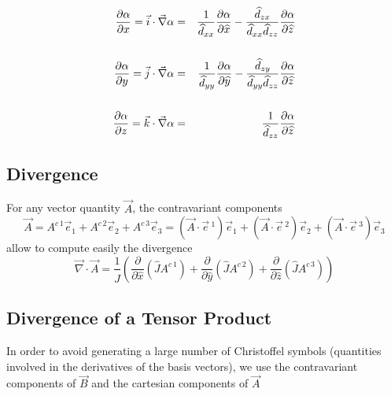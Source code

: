 \begin{eqnarray}
{\partial \alpha \over \partial x }  =
\vec{i} \cdot \vec{\nabla} \alpha & = & \dfrac{1}{\widehat{d}_{xx}}
\dfrac{\partial \alpha }{\partial \widehat{x}}- \dfrac{\widehat{d}_{zx}}{\widehat{d}_{xx}\widehat{d}_{zz}}
\dfrac{\partial \alpha }{\partial \widehat{z}}
\nonumber \\ & &\nonumber  \\
{\partial \alpha \over \partial y }  =
\vec{j} \cdot \vec{\nabla} \alpha & = & \dfrac{1}{\widehat{d}_{yy}}
\dfrac{\partial \alpha }{\partial \widehat{y}}- \dfrac{\widehat{d}_{zy}}{\widehat{d}_{yy}\widehat{d}_{zz}}
\dfrac{\partial \alpha }{\partial \widehat{z}}
\nonumber \\ & &  \\
{\partial \alpha \over \partial z }  =
\vec{k} \cdot \vec{\nabla} \alpha & = & \dfrac{1}{\widehat{d}_{zz}}
\dfrac{\partial \alpha }{\partial \widehat{z}} \nonumber
\end{eqnarray}


\subsection{Divergence}

For any vector quantity $\vec{A}$, the contravariant components
\begin{equation}
\vec{A} =A^{c \, 1}\vec{e} _{1} + A^{c \, 2}\vec{e} _{2}
 +A^{c \, 3}\vec{e} _{3} = (\vec{A} \cdot\vec{e}\, ^{1})\vec{e} _{1}
 + (\vec{A} \cdot\vec{e} \,^{2})\vec{e} _{2}
+ (\vec{A} \cdot\vec{e}\, ^{3})\vec{e} _{3}
\end{equation}
allow to compute easily the divergence
\begin{equation}
\vec{\nabla}\cdot \vec{A} = \dfrac{1}{\widehat{J}}\left(
\dfrac{\partial}{\partial \widehat{x}}(\widehat{J} A^{c \, 1})
+\dfrac{\partial}{\partial \widehat{y}}(\widehat{J} A^{c\, 2})
+\dfrac{\partial}{\partial \widehat{z}}(\widehat{J} A^{c\,  3}) \right)
\end{equation}

\subsection{Divergence of a Tensor Product}

In order to avoid generating a large number of Christoffel symbols (quantities
involved in the derivatives of the basis vectors), we use the
contravariant components of $\vec{B}$ and the cartesian components of $\vec{A}$

